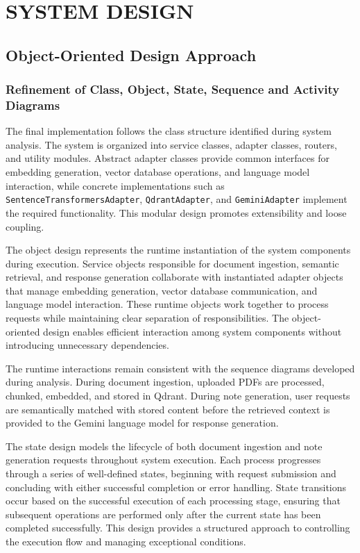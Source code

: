 \chapter{SYSTEM DESIGN}

\section{Object-Oriented Design Approach}

\subsection{Refinement of Class, Object, State, Sequence and Activity Diagrams}

The final implementation follows the class structure identified during system analysis. The system is organized into service classes, adapter classes, routers, and utility modules. Abstract adapter classes provide common interfaces for embedding generation, vector database operations, and language model interaction, while concrete implementations such as \texttt{SentenceTransformersAdapter}, \texttt{QdrantAdapter}, and \texttt{GeminiAdapter} implement the required functionality. This modular design promotes extensibility and loose coupling. \par

The object design represents the runtime instantiation of the system components during execution. Service objects responsible for document ingestion, semantic retrieval, and response generation collaborate with instantiated adapter objects that manage embedding generation, vector database communication, and language model interaction. These runtime objects work together to process requests while maintaining clear separation of responsibilities. The object-oriented design enables efficient interaction among system components without introducing unnecessary dependencies. \par 

The runtime interactions remain consistent with the sequence diagrams developed during analysis. During document ingestion, uploaded PDFs are processed, chunked, embedded, and stored in Qdrant. During note generation, user requests are semantically matched with stored content before the retrieved context is provided to the Gemini language model for response generation. \par

The state design models the lifecycle of both document ingestion and note generation requests throughout system execution. Each process progresses through a series of well-defined states, beginning with request submission and concluding with either successful completion or error handling. State transitions occur based on the successful execution of each processing stage, ensuring that subsequent operations are performed only after the current state has been completed successfully. This design provides a structured approach to controlling the execution flow and managing exceptional conditions. \par

